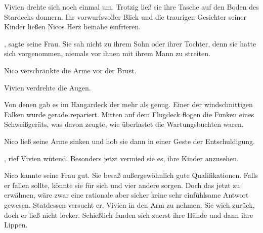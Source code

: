 Vivien drehte sich noch einmal um. Trotzig ließ sie ihre Tasche auf den Boden des Stardecks donnern. Ihr vorwurfsvoller Blick und die traurigen Gesichter seiner Kinder ließen Nicos Herz beinahe einfrieren.

\par

, sagte seine Frau. Sie sah nicht zu ihrem Sohn oder ihrer Tochter, denn sie hatte sich vorgenommen, niemals vor ihnen mit ihrem Mann zu streiten.

\par

Nico verschränkte die Arme vor der Brust. 

\par

Vivien verdrehte die Augen. 

\par

Von denen gab es im Hangardeck der  mehr als genug. Einer der windschnittigen Falken wurde gerade repariert. Mitten auf dem Flugdeck flogen die Funken eines Schweißgeräts, was davon zeugte, wie überlastet die Wartungsbuchten waren.

\par

 Nico ließ seine Arme sinken und hob sie dann in einer Geste der Entschuldigung. 

\par

, rief Vivien wütend.  Besonders jetzt vermied sie es, ihre Kinder anzusehen.

\par

Nico kannte seine Frau gut. Sie besaß außergewöhnlich gute Qualifikationen. Falls er fallen sollte, könnte sie für sich und vier andere sorgen. Doch das jetzt zu erwähnen, wäre zwar eine rationale aber sicher keine sehr einfühlsame Antwort gewesen. Statdessen versucht er, Vivien in den Arm zu nehmen. Sie wich zurück, doch er ließ nicht locker. Schießlich fanden sich zuerst ihre Hände und dann ihre Lippen.

